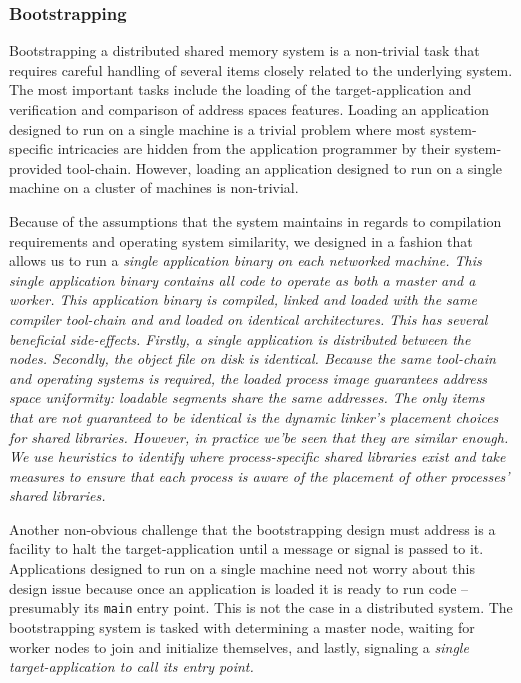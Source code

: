 \subsubsection{Bootstrapping}
Bootstrapping a distributed shared memory system is a non-trivial task that requires careful handling of several items closely related to the underlying system.  The most important tasks include the loading of the target-application and verification and comparison of address spaces features.  Loading an application designed to run on a single machine is a trivial problem where most system-specific intricacies are hidden from the application programmer by their system-provided tool-chain.  However, loading an application designed to run on a single machine on a cluster of machines is non-trivial.

Because of the assumptions that the \projname{} system maintains in regards to compilation requirements and operating system similarity, we designed \projname{} in a fashion that allows us to run a \em single \em application binary on each networked machine.  This \em single \em application binary contains all code to operate as both a master and a worker.  This application binary is compiled, linked and loaded with the same compiler tool-chain and and loaded on identical architectures.  This has several beneficial side-effects.  Firstly, a single application is distributed between the nodes.  Secondly, the object file on disk is identical.  Because the same tool-chain and operating systems is required, the loaded process image guarantees address space uniformity: loadable segments share the same addresses.  The only items that are not guaranteed to be identical is the dynamic linker's placement choices for shared libraries.  However, in practice we'be seen that they are similar enough.  We use heuristics to identify where process-specific shared libraries exist and take measures to ensure that each process is aware of the placement of other processes' shared libraries.

Another non-obvious challenge that the bootstrapping design must address is a facility to halt the target-application until a message or signal is passed to it.  Applications designed to run on a single machine need not worry about this design issue because once an application is loaded it is ready to run code -- presumably its \verb,main, entry point.  This is not the case in a distributed system.  The \projname{} bootstrapping system is tasked with determining a master node, waiting for worker nodes to join and initialize themselves, and lastly, signaling a \em single \em target-application to call its entry point.

